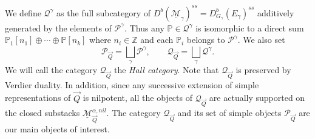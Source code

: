 \documentclass[a4paper,10pt]{amsart}
\def\Z{\mathbb{Z}}
\def\a{\alpha}
\def\QQ{\mathcal{Q}_{\vec{Q}}}
\numberwithin{equation}{section}
\begin{document}
\vspace{.1in}

We define $\mathcal{Q}^\gamma$ as the full subcategory of $D^b(\underline{\mathcal{M}}_{\gamma})^{ss} = D^b_{G_{\gamma}}(E_{\gamma})^{ss}$ additively generated by the elements of $\mathcal{P}^{\gamma}$. Thus any $\mathbb{P} \in \mathcal{Q}^{\gamma}$ is isomorphic to a direct sum $\mathbb{P}_1[n_1] \oplus \cdots \oplus \mathbb{P}[n_k]$ where $n_i \in \Z$ and each $\mathbb{P}_i$ belongs to $\mathcal{P}^{\gamma}$. We also set
$$\mathcal{P}_{\vec{Q}}=\bigsqcup_{\gamma} \mathcal{P}^{\gamma}, \qquad \mathcal{Q}_{\vec{Q}}=\bigsqcup_{\gamma} \mathcal{Q}^{\gamma}.$$
We will call the category $\QQ$ the \textit{Hall category}.
Note that $\QQ$ is preserved by Verdier duality. In addition, since any successive extension of simple representations of $\vec{Q}$ is nilpotent, all the objects of $\QQ$ are actually supported on the closed substacks $\underline{\mathcal{M}}^{\a,nil}_{\vec{Q}}$. The category $\mathcal{Q}_{\vec{Q}}$ and its set of simple objects $\mathcal{P}_{\vec{Q}}$ are our main objects of interest.

\vspace{.1in}
\end{document}
